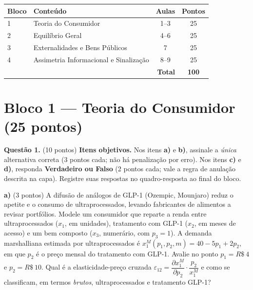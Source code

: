 
\ifsolucao\else
\begin{center}
\renewcommand{\arraystretch}{1.3}
\begin{tabular}{|l|l|c|c|}
\hline
\textbf{Bloco} & \textbf{Conteúdo} & \textbf{Aulas} & \textbf{Pontos} \\ \hline
1 & Teoria do Consumidor & 1--3 & 25 \\ \hline
2 & Equilíbrio Geral & 4--6 & 25 \\ \hline
3 & Externalidades e Bens Públicos & 7 & 25 \\ \hline
4 & Assimetria Informacional e Sinalização & 8--9 & 25 \\ \hline
\multicolumn{3}{|r|}{\textbf{Total}} & \textbf{100} \\ \hline
\end{tabular}
\end{center}
\vspace{0.5em}
\fi


\section*{Bloco 1 --- Teoria do Consumidor \hfill \normalsize (25 pontos)}

\textbf{Questão 1.} (10 pontos) \textbf{Itens objetivos.} Nos itens \textbf{a)} e \textbf{b)}, assinale a \emph{única} alternativa correta (3 pontos cada; não há penalização por erro). Nos itens \textbf{c)} e \textbf{d)}, responda \textbf{Verdadeiro ou Falso} (2 pontos cada; vale a regra de anulação descrita na capa). Registre suas respostas no quadro-resposta ao final do bloco.

\textbf{a)} (3 pontos) A difusão de análogos de GLP-1 (Ozempic, Mounjaro) reduz o apetite e o consumo de ultraprocessados, levando fabricantes de alimentos a revisar portfólios. Modele um consumidor que reparte a renda entre ultraprocessados ($x_1$, em unidades), tratamento com GLP-1 ($x_2$, em meses de acesso) e um bem composto ($x_3$, numerário, com $p_3=1$). A demanda marshalliana estimada por ultraprocessados é $x_1^{M}(p_1,p_2,m)=40-5p_1+2p_2$, em que $p_2$ é o preço mensal do tratamento com GLP-1. Avalie no ponto $p_1=R\$~4$ e $p_2=R\$~10$. Qual é a elasticidade-preço cruzada $\varepsilon_{12}=\dfrac{\partial x_1^{M}}{\partial p_2}\cdot\dfrac{p_2}{x_1^{M}}$ e como se classificam, em termos \emph{brutos}, ultraprocessados e tratamento GLP-1?

